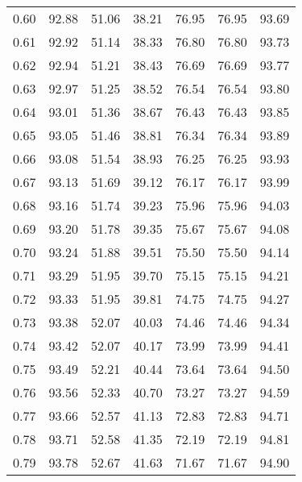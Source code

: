 \begin{tabular}{|c|c|c|c|c|c|c|}
      0.60 &     92.88 &     51.06 &      38.21 &   76.95 &      76.95 &         93.69 \\
      0.61 &     92.92 &     51.14 &      38.33 &   76.80 &      76.80 &         93.73 \\
      0.62 &     92.94 &     51.21 &      38.43 &   76.69 &      76.69 &         93.77 \\
      0.63 &     92.97 &     51.25 &      38.52 &   76.54 &      76.54 &         93.80 \\
      0.64 &     93.01 &     51.36 &      38.67 &   76.43 &      76.43 &         93.85 \\
      0.65 &     93.05 &     51.46 &      38.81 &   76.34 &      76.34 &         93.89 \\
      0.66 &     93.08 &     51.54 &      38.93 &   76.25 &      76.25 &         93.93 \\
      0.67 &     93.13 &     51.69 &      39.12 &   76.17 &      76.17 &         93.99 \\
      0.68 &     93.16 &     51.74 &      39.23 &   75.96 &      75.96 &         94.03 \\
      0.69 &     93.20 &     51.78 &      39.35 &   75.67 &      75.67 &         94.08 \\
      0.70 &     93.24 &     51.88 &      39.51 &   75.50 &      75.50 &         94.14 \\
      0.71 &     93.29 &     51.95 &      39.70 &   75.15 &      75.15 &         94.21 \\
      0.72 &     93.33 &     51.95 &      39.81 &   74.75 &      74.75 &         94.27 \\
      0.73 &     93.38 &     52.07 &      40.03 &   74.46 &      74.46 &         94.34 \\
      0.74 &     93.42 &     52.07 &      40.17 &   73.99 &      73.99 &         94.41 \\
      0.75 &     93.49 &     52.21 &      40.44 &   73.64 &      73.64 &         94.50 \\
      0.76 &     93.56 &     52.33 &      40.70 &   73.27 &      73.27 &         94.59 \\
      0.77 &     93.66 &     52.57 &      41.13 &   72.83 &      72.83 &         94.71 \\
      0.78 &     93.71 &     52.58 &      41.35 &   72.19 &      72.19 &         94.81 \\
      0.79 &     93.78 &     52.67 &      41.63 &   71.67 &      71.67 &         94.90 \\

\end{tabular}
